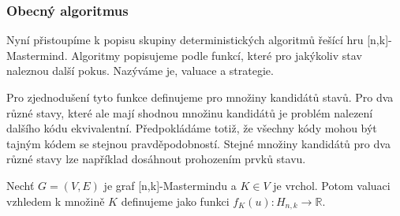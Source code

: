 

\subsubsection{Obecný algoritmus}
Nyní přistoupíme k popisu skupiny deterministických algoritmů řešící hru [n,k]-Mastermind. Algoritmy popisujeme podle funkcí, které pro jakýkoliv stav naleznou další pokus. Nazýváme je, valuace a strategie. 

Pro zjednodušení tyto funkce definujeme pro množiny kandidátů stavů. Pro dva různé stavy, které ale mají shodnou množinu kandidátů je problém nalezení dalšího kódu ekvivalentní. Předpokládáme totiž, že všechny kódy mohou být tajným kódem se stejnou pravděpodobností. Stejné množiny kandidátů pro dva různé stavy lze například dosáhnout prohozením prvků stavu. 








\begin{definice}[Valuace]
    Nechť $G = (V,E)$ je graf [n,k]-Mastermindu a $K \in V$ je vrchol. Potom valuaci vzhledem k množině $K$ definujeme jako funkci $f_K(u) \colon H_{n,k} \to \mathbb{R}$.
\end{definice}


